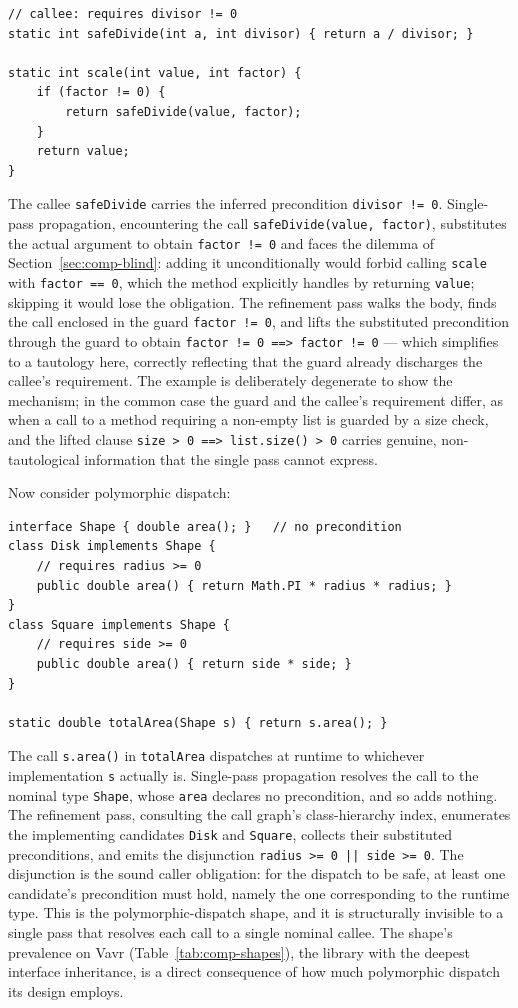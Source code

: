 \begin{lstlisting}
// callee: requires divisor != 0
static int safeDivide(int a, int divisor) { return a / divisor; }

static int scale(int value, int factor) {
    if (factor != 0) {
        return safeDivide(value, factor);
    }
    return value;
}
\end{lstlisting}

The callee \texttt{safeDivide} carries the inferred precondition
\texttt{divisor != 0}. Single-pass propagation, encountering the call
\texttt{safeDivide(value, factor)}, substitutes the actual argument to obtain
\texttt{factor != 0} and faces the dilemma of Section~\ref{sec:comp-blind}:
adding it unconditionally would forbid calling \texttt{scale} with
\texttt{factor == 0}, which the method explicitly handles by returning
\texttt{value}; skipping it would lose the obligation. The refinement pass walks
the body, finds the call enclosed in the guard \texttt{factor != 0}, and lifts
the substituted precondition through the guard to obtain
\texttt{factor != 0 ==> factor != 0} --- which simplifies to a tautology here,
correctly reflecting that the guard already discharges the callee's requirement.
The example is deliberately degenerate to show the mechanism; in the common case
the guard and the callee's requirement differ, as when a call to a method
requiring a non-empty list is guarded by a size check, and the lifted clause
\texttt{size > 0 ==> list.size() > 0} carries genuine, non-tautological
information that the single pass cannot express.

Now consider polymorphic dispatch:

\begin{lstlisting}
interface Shape { double area(); }   // no precondition
class Disk implements Shape {
    // requires radius >= 0
    public double area() { return Math.PI * radius * radius; }
}
class Square implements Shape {
    // requires side >= 0
    public double area() { return side * side; }
}

static double totalArea(Shape s) { return s.area(); }
\end{lstlisting}

The call \texttt{s.area()} in \texttt{totalArea} dispatches at runtime to
whichever implementation \texttt{s} actually is. Single-pass propagation resolves
the call to the nominal type \texttt{Shape}, whose \texttt{area} declares no
precondition, and so adds nothing. The refinement pass, consulting the call
graph's class-hierarchy index, enumerates the implementing candidates
\texttt{Disk} and \texttt{Square}, collects their substituted preconditions, and
emits the disjunction \texttt{radius >= 0 || side >= 0}. The disjunction is the
sound caller obligation: for the dispatch to be safe, at least one candidate's
precondition must hold, namely the one corresponding to the runtime type. This is
the polymorphic-dispatch shape, and it is structurally invisible to a single pass
that resolves each call to a single nominal callee. The shape's prevalence on
Vavr (Table~\ref{tab:comp-shapes}), the library with the deepest interface
inheritance, is a direct consequence of how much polymorphic dispatch its design
employs.

